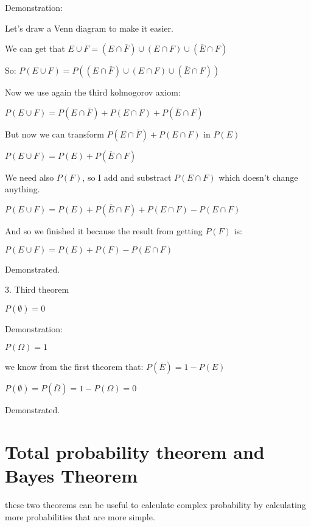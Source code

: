 \documentclass{article}
\begin{document}
Demonstration:

Let's draw a Venn diagram to make it easier.


We can get that $E \cup F = (E \cap \bar F) \cup (E \cap F) \cup (\bar E \cap F)$

So: $P(E \cup F) = P((E \cap \bar F) \cup (E \cap F) \cup (\bar E \cap F))$

Now we use again the third kolmogorov axiom:

$P(E \cup F) = P(E \cap \bar F) + P(E \cap F) + P(\bar E \cap F)$

But now we can transform $P(E \cap \bar F) + P(E \cap F)$ in $P(E)$ 

$P(E \cup F) = P(E) + P(\bar E \cap F)$

We need also $P(F)$, so I add and substract $P(E \cap F)$ which doesn't change anything.

$P(E \cup F) = P(E) + P(\bar E \cap F) + P(E \cap F) - P(E \cap F)$

And so we finished it because the result from getting $P(F)$ is:

$P(E \cup F) = P(E) + P(F) - P(E \cap F)$

Demonstrated.
\bigskip

3. Third theorem

$P(\emptyset) = 0$
\bigskip

Demonstration:

$P(\Omega) = 1$

we know from the first theorem that: $P(\bar E) = 1 - P(E)$

$P(\emptyset) = P(\bar \Omega) = 1 - P(\Omega) = 0$

Demonstrated.

\section{Total probability theorem and Bayes Theorem}

these two theorems can be useful to calculate complex probability by calculating more probabilities that are more simple.
\end{document}
